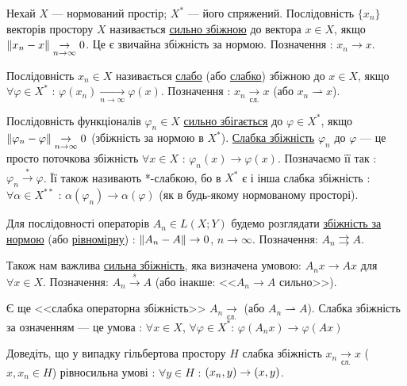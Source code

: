 
\begin{theory}
    Нехай $X$ --- нормований простір; $X^*$ --- його спряжений. Послідовність $\{x_n\}$ 
    векторів простору $X$ називається \ul{сильно збіжною} до вектора $x \in X$, якщо 
    $\left\lVert x_n - x\right\rVert \underset{n \rightarrow \infty}{\rightarrow} 0$. Це є звичайна збіжність 
    за нормою. Позначення : $x_n \rightarrow x$.

    Послідовність $x_n \in X$ називається \ul{слабо} (або \ul{слабко}) збіжною до $x \in X$, 
    якщо $\forall \varphi \in X^*$ : $\varphi(x_n) \underset{n \rightarrow \infty}{\rightarrow} 
    \varphi(x)$. Позначення : $x_n \underset{\text{сл.}}{\rightarrow} x$ 
    (або $x_n \rightharpoonup x$).

    Послідовність функціоналів $\varphi_n \in X$ \ul{сильно збігається} до $\varphi \in X^*$, 
    якщо $\left\lVert\varphi_n - \varphi\right\rVert \underset{n \rightarrow \infty}{\rightarrow} 0$ 
    (збіжність за нормою в $X^*$). \ul{Слабка збіжність} $\varphi_n$ до $\varphi$ --- 
    це просто поточкова збіжність  $\forall x \in X$ : $\varphi_n(x) \rightarrow \varphi(x)$.
    Позначаємо її так : $\varphi_n \overset{*}{\rightarrow} \varphi$. 
    Її також називають *-слабкою, бо в $X^*$ є і інша слабка збіжність : $\forall \alpha 
    \in X^{**}$ : $\alpha(\varphi_n) \rightarrow \alpha(\varphi)$ (як в будь-якому 
    нормованому просторі).

    Для послідовності операторів $A_n \in L(X; Y)$ будемо розглядати \ul{збіжність за нормою} 
    (або \ul{рівномірну}) : $\left\lVert A_n - A\right\rVert \rightarrow 0$, $n \rightarrow \infty$. 
    Позначення: $A_n \rightrightarrows A$.

    Також нам важлива \ul{сильна збіжність}, яка визначена умовою: 
    $A_n x \rightarrow Ax$ для $\forall x \in X$. Позначення: $A_n \overset{s}{\rightarrow} A$ 
    (або інакше: <<$A_n \rightarrow A$ сильно>>).

    Є ще <<слабка операторна збіжність>> $A_n \underset{\text{сл.}}{\rightarrow}$ 
    (або $A_n \rightharpoonup A$). Слабка збіжність за означенням --- це умова : 
    $\forall x \in X$, $\forall \varphi \in X^*$: $\varphi(A_nx) \rightarrow \varphi(Ax)$
\end{theory}

\begin{exercise}
    Доведіть, що у випадку гільбертова простору $H$ слабка збіжність $x_n 
    \underset{\text{сл.}}{\rightarrow} x$ ($x, x_n \in H$) рівносильна умові : 
    $\forall y \in H$ : $\left(x_n, y\right) \rightarrow \left(x, y\right)$.
\end{exercise}

